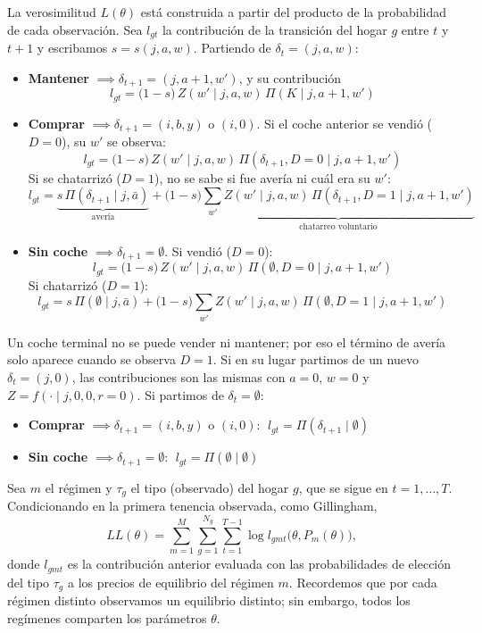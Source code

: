 \documentclass{article}
\begin{document}
La verosimilitud $L(\theta)$ está construida a partir del producto de la probabilidad de cada observación. Sea $l_{gt}$ la contribución de la transición del hogar $g$ entre $t$ y $t+1$ y escribamos $s=s(j,a,w)$. Partiendo de $\delta_t=(j,a,w)$:
\begin{itemize}
    \item \textbf{Mantener} $\implies\delta_{t+1}=(j,a+1,w')$, y su contribución
    $$l_{gt}=\big(1-s\big)\,Z(w'\mid j,a,w)\,\Pi(K\mid j,a+1,w')$$
    \item \textbf{Comprar} $\implies\delta_{t+1}=(i,b,y)$ o $(i,0)$. Si el coche anterior se vendió ($D=0$), su $w'$ se observa:
    $$l_{gt}=\big(1-s\big)\,Z(w'\mid j,a,w)\,\Pi(\delta_{t+1},D=0\mid j,a+1,w')$$
    Si se chatarrizó ($D=1$), no se sabe si fue avería ni cuál era su $w'$:
    $$l_{gt}=\underbrace{s\,\Pi(\delta_{t+1}\mid j,\bar{a})}_{\text{avería}}+\big(1-s\big)\underbrace{\sum_{w'}Z(w'\mid j,a,w)\,\Pi(\delta_{t+1},D=1\mid j,a+1,w')}_{\text{chatarreo voluntario}}$$
    \item \textbf{Sin coche} $\implies\delta_{t+1}=\emptyset$. Si vendió ($D=0$):
    $$l_{gt}=\big(1-s\big)\,Z(w'\mid j,a,w)\,\Pi(\emptyset,D=0\mid j,a+1,w')$$
    Si chatarrizó ($D=1$):
    $$l_{gt}=s\,\Pi(\emptyset\mid j,\bar{a})+\big(1-s\big)\sum_{w'}Z(w'\mid j,a,w)\,\Pi(\emptyset,D=1\mid j,a+1,w')$$
\end{itemize}
Un coche terminal no se puede vender ni mantener; por eso el término de avería solo aparece cuando se observa $D=1$. Si en su lugar partimos de un nuevo $\delta_t=(j,0)$, las contribuciones son las mismas con $a=0$, $w=0$ y $Z=f(\cdot\mid j,0,0,r=0)$. Si partimos de $\delta_t=\emptyset$:
\begin{itemize}
    \item \textbf{Comprar} $\implies\delta_{t+1}=(i,b,y)$ o $(i,0)$: $\;l_{gt}=\Pi(\delta_{t+1}\mid\emptyset)$
    \item \textbf{Sin coche} $\implies\delta_{t+1}=\emptyset$: $\;l_{gt}=\Pi(\emptyset\mid\emptyset)$
\end{itemize}

Sea $m$ el régimen y $\tau_g$ el tipo (observado) del hogar $g$, que se sigue en $t=1,\dots,T$. Condicionando en la primera tenencia observada, como Gillingham,
$$LL(\theta)=\sum_{m=1}^{M}\sum_{g=1}^{N_g}\sum_{t=1}^{T-1}\log l_{gmt}\big(\theta,P_m(\theta)\big),$$
donde $l_{gmt}$ es la contribución anterior evaluada con las probabilidades de elección del tipo $\tau_g$ a los precios de equilibrio del régimen $m$. Recordemos que por cada régimen distinto observamos un equilibrio distinto; sin embargo, todos los regímenes comparten los parámetros $\theta$.
\end{document}
